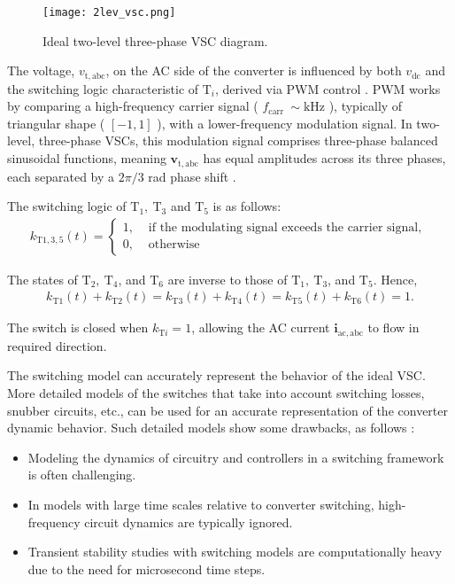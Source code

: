 \begin{figure}[htbp]
    \centering
    \texttt{[image: 2lev\_vsc.png]}
    \caption{Ideal two-level three-phase VSC diagram.}
    \label{fig:2lev_vsc}
\end{figure}

The voltage, $v_{\mathrm{t, abc}}$, on the AC side of the converter is influenced by both $v_{\mathrm{dc}}$ and the switching logic characteristic of $\mathrm{T}_i$, derived via PWM control \autocite{mohan2003power}. PWM works by comparing a high-frequency carrier signal ( $f_{\text {carr }} \sim \mathrm{kHz}$ ), typically of triangular shape ( $[-1,1]$ ), with a lower-frequency modulation signal. In two-level, three-phase VSCs, this modulation signal comprises three-phase balanced sinusoidal functions, meaning $\boldsymbol{v}_{\mathrm{t, abc}}$ has equal amplitudes across its three phases, each separated by a $2 \pi / 3$ rad phase shift \autocite{Milano_2019_ess}.

The switching logic of $\mathrm{T}_1, \mathrm{~T}_3$ and $\mathrm{T}_5$ is as follows:
\begin{equation}
    \begin{aligned}
    k_{\mathrm{T} 1,3,5}(t)= \begin{cases}1, & \text { if the modulating signal exceeds the carrier signal, } \\ 0, & \text { otherwise }\end{cases}
    \end{aligned}
\end{equation}

The states of $\mathrm{T}_2, \mathrm{~T}_4$, and $\mathrm{T}_6$ are inverse to those of $\mathrm{T}_1, \mathrm{~T}_3$, and $\mathrm{T}_5$. Hence,
\begin{equation}
    \begin{aligned}
    k_{\mathrm{T} 1}(t)+k_{\mathrm{T} 2}(t)=k_{\mathrm{T} 3}(t)+k_{\mathrm{T} 4}(t)=k_{\mathrm{T} 5}(t)+k_{\mathrm{T} 6}(t)=1.
    \end{aligned}
\end{equation}

The switch is closed when $k_{\mathrm{T} i}=1$, allowing the AC current $\boldsymbol{i}_{\mathrm{ac}, \mathrm{abc}}$ to flow in required direction.

The switching model can accurately represent the behavior of the ideal VSC. More detailed models of the switches that take into account switching losses, snubber circuits, etc., can be used for an accurate representation of the converter dynamic behavior. Such detailed models show some drawbacks, as follows \autocite{Milano_2019_ess}:
\begin{itemize}
    \item Modeling the dynamics of circuitry and controllers in a switching framework is often challenging. 
    \item In models with large time scales relative to converter switching, high-frequency circuit dynamics are typically ignored.
    \item Transient stability studies with switching models are computationally heavy due to the need for microsecond time steps. 
\end{itemize}


